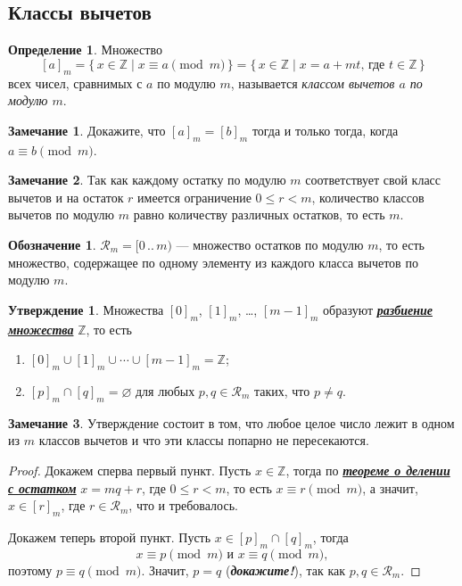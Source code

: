 \documentclass[14pt, a4paper]{extarticle}
\theoremstyle{definition}
\newtheorem*{definition}{Определение}
\newtheorem*{remark}{Замечание}
\newtheorem*{desig}{Обозначение}
\newtheorem{statement}{Утверждение}
\begin{document}
\subsection{Классы вычетов}
\label{sysvych}

	\begin{definition}
		Множество $$[a]_m=\{\,x\in\mathbb{Z}\mid x\equiv a\pmod{m}\,\}=\{\,x\in\mathbb{Z}\mid x=a+mt\text{, где }t\in\mathbb{Z}\,\}$$ всех чисел, сравнимых с $a$ по модулю $m$, называется \emph{классом вычетов $a$ по модулю $m$}.
	\end{definition}
	
	\begin{remark}
		Докажите, что $[a]_m=[b]_m$ тогда и только тогда, когда $a\equiv b\pmod{m}$.
	\end{remark}
	
	\begin{remark}
		Так как каждому остатку по модулю $m$ соответствует свой класс вычетов и на остаток $r$ имеется ограничение $0\leqslant r<m$, количество классов вычетов по модулю $m$ равно количеству различных остатков, то есть $m$.
	\end{remark}
	
	\begin{desig}
		$\mathcal{R}_m=[0\,..\,m)$ --- множество остатков по модулю $m$, то есть множество, содержащее по одному элементу из каждого класса вычетов по модулю $m$.
	\end{desig}
	
	\begin{statement}
		Множества $[0]_m$, $[1]_m$, \dots, $[m-1]_m$ образуют \href{https://ru.wikipedia.org/wiki/%D0%A0%D0%B0%D0%B7%D0%B1%D0%B8%D0%B5%D0%BD%D0%B8%D0%B5_%D0%BC%D0%BD%D0%BE%D0%B6%D0%B5%D1%81%D1%82%D0%B2%D0%B0}{\textbf{\textit{разбиение множества}}} $\mathbb{Z}$, то есть
		\begin{enumerate}[topsep=0pt,itemsep=-1ex,partopsep=1ex,parsep=1ex]
			\item $[0]_m\cup[1]_m\cup\cdots\cup[m-1]_m=\mathbb{Z}$;
			\item $[p]_m\cap[q]_m=\varnothing$ для любых $p,q\in\mathcal{R}_m$ таких, что $p\neq q$.
		\end{enumerate}
	\end{statement}
	\begin{remark}
		Утверждение состоит в том, что любое целое число лежит в одном из $m$ классов вычетов и что эти классы попарно не пересекаются.
	\end{remark}
	\begin{proof}
		Докажем сперва первый пункт. Пусть $x\in\mathbb{Z}$, тогда по \hyperref[ost]{\textbf{\textit{теореме о делении с остатком}}} $x=mq+r$, где $0\leqslant r<m$, то есть $x\equiv r\pmod{m}$, а значит, $x\in[r]_m$, где $r\in\mathcal{R}_m$, что и требовалось.
		
		Докажем теперь второй пункт. Пусть $x\in[p]_m\cap[q]_m$, тогда $$x\equiv p\pmod{m}\text{ и }x\equiv q\pmod{m},$$ поэтому $p\equiv q\pmod{m}$. Значит, $p=q$ (\textbf{\textit{докажите!}}), так как \mbox{$p,q\in\mathcal{R}_m$}.
	\end{proof}
\end{document}
